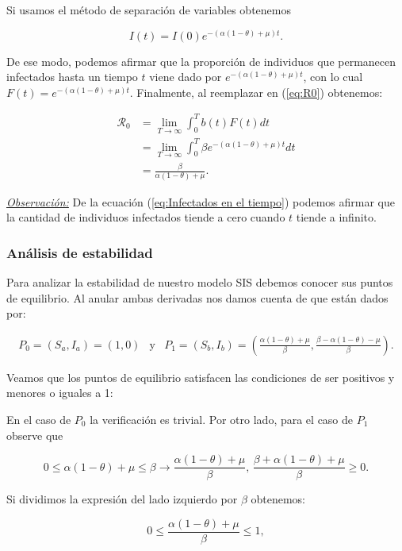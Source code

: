 Si usamos el método de separación de variables obtenemos

\begin{equation}\label{eq:Infectados en el tiempo}
I(t) = I(0)e^{-(\alpha(1-\theta)+\mu)t}.
\end{equation}

De ese modo, podemos afirmar que la proporción de individuos que permanecen infectados hasta un tiempo $t$ viene dado por $e^{-(\alpha(1-\theta)+\mu)t}$, con lo cual $F(t)=e^{-(\alpha(1-\theta)+\mu)t}$. Finalmente, al reemplazar en (\ref{eq:R0}) obtenemos:

\begin{align*}
\mathcal{R}_0 &= \lim_{T\to\infty}\int_0^T b(t)F(t) dt \\
&= \lim_{T\to\infty}\int_0^T \beta e^{-(\alpha(1-\theta)+\mu)t} dt\\
&= \frac{\beta}{\alpha(1-\theta)+\mu}.
\end{align*}

\underline{\textit{Observación:}} De la ecuación (\ref{eq:Infectados en el tiempo}) podemos afirmar que la cantidad de individuos infectados tiende a cero cuando $t$ tiende a infinito.

\subsubsection{Análisis de estabilidad}

Para analizar la estabilidad de nuestro modelo SIS debemos conocer sus puntos de equilibrio. Al anular ambas derivadas nos damos cuenta de que están dados por:

$$\begin{array}{ccc}
    P_0=(S_a,I_a)=(1,0) & \text{y} & P_1=(S_b,I_b)=\left(\frac{\alpha(1-\theta)+\mu}{\beta},\frac{\beta-\alpha(1-\theta)-\mu}{\beta}\right).
\end{array}$$

Veamos que los puntos de equilibrio satisfacen las condiciones de ser positivos y menores o iguales a 1:

En el caso de $P_0$ la verificación es trivial. Por otro lado, para el caso de $P_1$ observe que 

$$0\leq\alpha(1-\theta)+\mu\leq\beta \longrightarrow \frac{\alpha(1-\theta)+\mu}{\beta}\text{, }\frac{\beta+\alpha(1-\theta)+\mu}{\beta}\geq0.$$

Si dividimos la expresión del lado izquierdo por $\beta$ obtenemos:

$$0\leq \frac{\alpha(1-\theta)+\mu}{\beta}\leq1,$$

